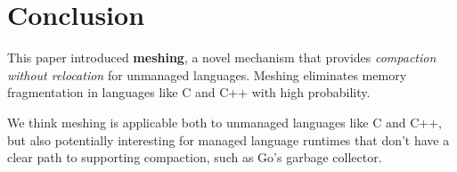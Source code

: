 \section{Conclusion}
\label{sec:conclusion}

This paper introduced \textbf{meshing}, a novel mechanism that
provides \textit{compaction without relocation} for unmanaged
languages.  Meshing eliminates memory fragmentation in languages like
C and C++ with high probability.

We think meshing is applicable both to unmanaged languages like C and
C++, but also potentially interesting for managed language runtimes
that don't have a clear path to supporting compaction, such as Go's
garbage collector.
